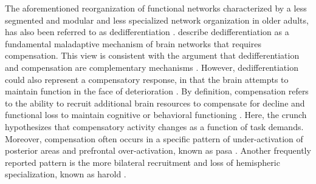 \noindent The aforementioned reorganization of functional networks characterized by a less segmented and modular and less specialized network organization in older adults, has also been referred to as dedifferentiation \cite{Deery2023, Koen2019, Sala-Llonch2015}. \citeauthor{Fornito2015} \cite{Fornito2015} describe dedifferentiation as a fundamental maladaptive mechanism of brain networks that requires compensation. This view is consistent with the argument that dedifferentiation and compensation are complementary mechanisms \cite{Reuter-Lorenz2010}. However, dedifferentiation could also represent a compensatory response, in that the brain attempts to maintain function in the face of deterioration \cite{Stern2009}. By definition, compensation refers to the ability to recruit additional brain resources to compensate for decline and functional loss to maintain cognitive or behavioral functioning \cite{Reuter-Lorenz2010, Grady2012}. Here, the \gls{crunch} hypothesizes that compensatory activity changes as a function of task demands. Moreover, compensation often occurs in a specific pattern of under-activation of posterior areas and prefrontal over-activation, known as \gls{pasa} \cite{Davis2007}. Another frequently reported pattern is the more bilateral recruitment and loss of hemispheric specialization, known as \gls{harold} \cite{Cabeza2002}.

